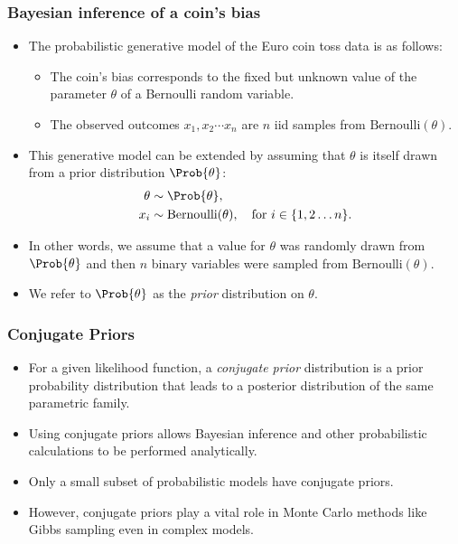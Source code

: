 \documentclass{slides}
\begin{document}
\begin{frame}
	\frametitle{Bayesian inference of a coin's bias}
	\begin{itemize}
		\item The probabilistic generative model of the Euro coin toss data is as follows:
			\begin{itemize}
				\item The coin's bias corresponds to the fixed but unknown value of the parameter $\theta$ of a Bernoulli random variable.
				\item The observed outcomes $x_1, x_2 \cdots x_n$ are $n$ iid samples from $\textrm{Bernoulli}(\theta)$.
			\end{itemize}
		\item This generative model can be extended by assuming that $\theta$ is itself drawn from a prior distribution $\Prob{\theta}$:
			\begin{align*}
				\theta &\sim \Prob{\theta},\\
				x_i &\sim \textrm{Bernoulli}(\theta),\quad\text{for $i \in \{1,2\ldots n\}$.}
			\end{align*}
		\item In other words, we assume that a value for $\theta$ was randomly drawn from $\Prob{\theta}$ and then $n$ binary variables were sampled from $\textrm{Bernoulli}(\theta)$.
		\item We refer to $\Prob{\theta}$ as the \emph{prior} distribution on $\theta$.
	\end{itemize}
\end{frame}

\begin{frame}
	\frametitle{Conjugate Priors}
	\begin{itemize}
		\item For a given likelihood function, a \emph{conjugate prior} distribution is a prior probability distribution that leads to a posterior distribution of the same parametric family.
		\item Using conjugate priors allows Bayesian inference and other probabilistic calculations to be performed analytically.
		\item Only a small subset of probabilistic models have conjugate priors.
		\item However, conjugate priors play a vital role in Monte Carlo methods like Gibbs sampling even in complex models.
	\end{itemize}
\end{frame}
\end{document}
